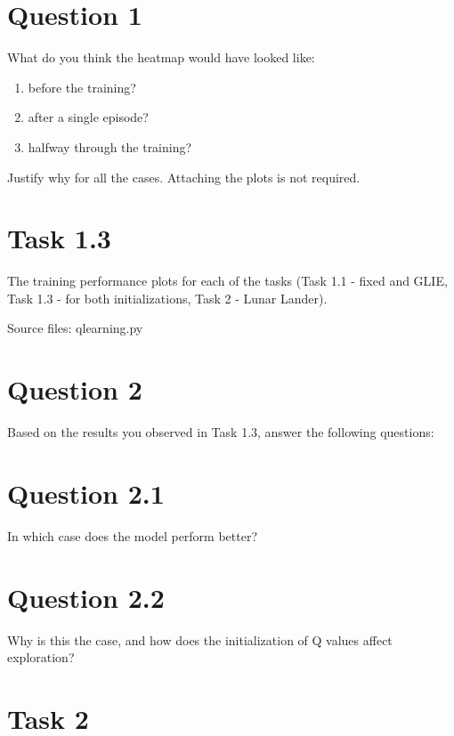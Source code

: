 \documentclass[12pt]{article}
\begin{document}
\section*{Question 1}

What do you think the heatmap would have looked like:

\begin{enumerate}[label=(\alph*)]
    \item before the training?
    \item after a single episode?
    \item halfway through the training?
\end{enumerate}

\noindent
Justify why for all the cases. Attaching the plots is not required.

\section*{Task 1.3}

The training performance plots for each of the tasks (Task 1.1 - fixed and GLIE, Task
1.3 - for both initializations, Task 2 - Lunar Lander).
\newline

\noindent
Source files: qlearning.py

\section*{Question 2}

Based on the results you observed in Task 1.3, answer the following questions:

\section*{Question 2.1}

In which case does the model perform better?

\section*{Question 2.2}

Why is this the case, and how does the initialization of Q values affect exploration?


\section*{Task 2}
\end{document}

